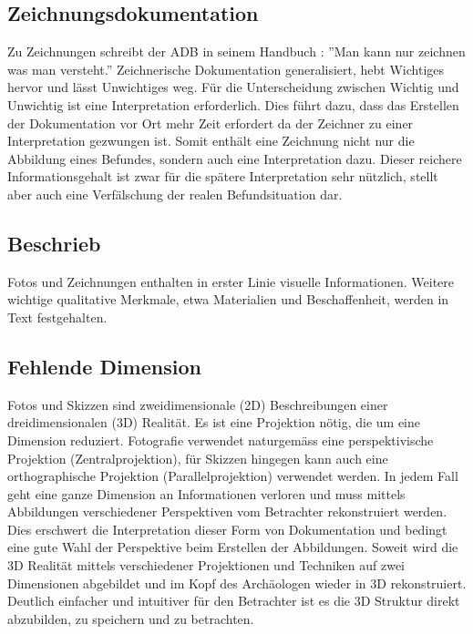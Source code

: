 		\subsection{Zeichnungsdokumentation}
			Zu Zeichnungen schreibt der ADB in seinem Handbuch \cite{adb:handbuch}: ''Man kann nur zeichnen was man versteht.''
			Zeichnerische Dokumentation generalisiert, hebt Wichtiges hervor und lässt Unwichtiges weg. Für die Unterscheidung zwischen Wichtig und Unwichtig ist eine Interpretation erforderlich.
			Dies führt dazu, dass das Erstellen der Dokumentation vor Ort mehr Zeit erfordert da der Zeichner zu einer Interpretation gezwungen ist. Somit enthält eine Zeichnung nicht nur die Abbildung eines Befundes, sondern auch eine Interpretation dazu. Dieser reichere Informationsgehalt ist zwar für die spätere Interpretation sehr nützlich, stellt aber auch eine Verfälschung der realen Befundsituation dar.
			
		\subsection{Beschrieb}
			Fotos und Zeichnungen enthalten in erster Linie visuelle Informationen. Weitere wichtige qualitative Merkmale, etwa Materialien und Beschaffenheit, werden in Text festgehalten.
		
			
		\subsection{Fehlende Dimension}
			Fotos und Skizzen sind zweidimensionale (2D) Beschreibungen einer dreidimensionalen (3D) Realität. Es ist eine Projektion nötig, die um eine Dimension reduziert. Fotografie verwendet naturgemäss eine perspektivische Projektion (Zentralprojektion), für Skizzen hingegen kann auch eine orthographische Projektion (Parallelprojektion) verwendet werden.
			In jedem Fall geht eine ganze Dimension an Informationen verloren und muss mittels Abbildungen verschiedener Perspektiven vom Betrachter rekonstruiert werden.
			Dies erschwert die Interpretation dieser Form von Dokumentation und bedingt eine gute Wahl der Perspektive beim Erstellen der Abbildungen.
			Soweit wird die 3D Realität mittels verschiedener Projektionen und Techniken auf zwei Dimensionen abgebildet und im Kopf des Archäologen wieder in 3D rekonstruiert.
			Deutlich einfacher und intuitiver für den Betrachter ist es die 3D Struktur direkt abzubilden, zu speichern und zu betrachten.
